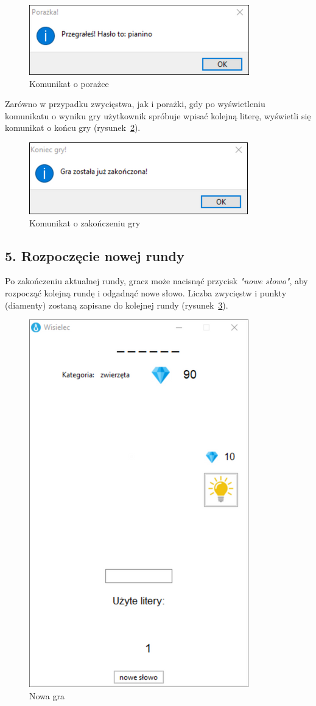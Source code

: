 \documentclass[]{report}
\begin{document}
\FloatBarrier
\begin{figure}[H]
	\centering
	\includegraphics[width=0.5\linewidth]{porazka}
	\caption{Komunikat o porażce}
	\label{fig:porazka}
\end{figure}

\vspace{0.1cm}
Zarówno w przypadku zwycięstwa, jak i porażki, gdy po wyświetleniu komunikatu o wyniku gry użytkownik spróbuje wpisać kolejną literę, wyświetli się komunikat o końcu gry (rysunek~\ref{fig:koniec}).

\FloatBarrier
\begin{figure}[H]
	\centering
	\includegraphics[width=0.5\linewidth]{koniec_gry}
	\caption{Komunikat o zakończeniu gry}
	\label{fig:koniec}
\end{figure}

\subsection*{5. Rozpoczęcie nowej rundy}

Po zakończeniu aktualnej rundy, gracz może nacisnąć przycisk \textit{"nowe słowo"}, aby rozpocząć kolejną rundę i odgadnąć nowe słowo. Liczba zwycięstw i punkty (diamenty) zostaną zapisane do kolejnej rundy (rysunek~\ref{fig:nowa_gra}).

\FloatBarrier
\begin{figure}[H]
	\centering
	\includegraphics[width=0.45\linewidth]{11}
	\caption{Nowa gra}
	\label{fig:nowa_gra}
\end{figure}
\end{document}

